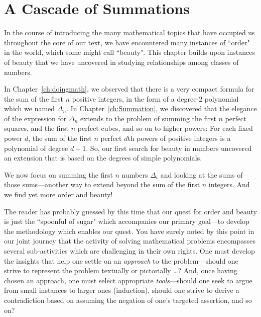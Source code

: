 
\chapter{A Cascade of Summations}
\label{Appendix:Tetra}

In the course of introducing the many mathematical topics that have occupied us throughout the core of our text, we have encountered many instances of ``order" in the world, which some might call ``beauty".  This chapter builds upon instances of beauty that we have uncovered in studying relationships among classes of numbers.

\medskip

In Chapter~\ref{ch:doingmath}, we observed that there is a very compact formula for the sum of the first $n$ positive integers, in the form of a degree-$2$ polynomial which we named $\Delta_n$.  In Chapter~\ref{ch:Summation}, we discovered that the elegance of the expression for $\Delta_n$ extends to the problem of summing the first $n$ perfect squares, and the first $n$ perfect cubes, and so on to higher powers:  For each fixed power $d$, the sum of the first $n$ perfect $d$th powers of positive integers is a polynomial of degree $d+1$.  So, our first search for beauty in numbers uncovered an extension that is based on the degrees of simple polynomials.

\smallskip

We now focus on summing the first $n$ numbers $\Delta_i$ and looking at the sums of those sums---another way to extend beyond the sum of the first $n$ integers.  And we find yet more order and beauty!

\medskip

The reader has probably guessed by this time that our quest for order and beauty is just the ``spoonful of sugar" which accompanies our primary goal---to develop the methodology which enables our quest.  You have surely noted by this point in our joint journey that the activity of solving mathematical problems encompasses several sub-activities which are challenging in their own rights.  One must develop the insights that help one settle on an {\em approach} to the problem---should one strive to represent the problem textually or pictorially \ldots?  And, once having chosen an approach, one must select appropriate {\em tools}---should one seek to argue from small instances to larger ones (induction), should one strive to derive a contradiction based on assuming the negation of one's targeted assertion, and so on?

